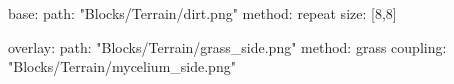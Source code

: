 base:
  path: "Blocks/Terrain/dirt.png"
  method: repeat
  size: [8,8]

overlay:
  path: "Blocks/Terrain/grass_side.png"
  method: grass
  coupling: "Blocks/Terrain/mycelium_side.png"
